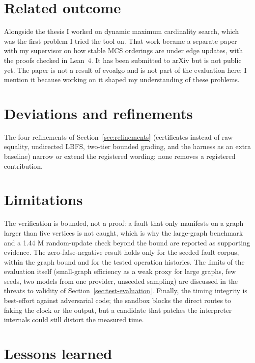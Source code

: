 \section{Related outcome}

Alongside the thesis I worked on dynamic maximum cardinality search, which was
the first problem I tried the tool on. That work became a separate paper with my
supervisor on how stable MCS orderings are under edge updates, with the proofs
checked in Lean~4. It has been submitted to arXiv but is not public yet. The
paper is not a result of evoalgo and is not part of the evaluation here; I
mention it because working on it shaped my understanding of these problems.

\section{Deviations and refinements}

The four refinements of Section~\ref{sec:refinements} (certificates instead of
raw equality, undirected LBFS, two-tier bounded grading, and the harness as an
extra baseline) narrow or extend the registered wording; none removes a
registered contribution.

\section{Limitations}

The verification is bounded, not a proof: a fault that only manifests on a
graph larger than five vertices is not caught, which is why the large-graph
benchmark and a 1.44 M random-update check beyond the bound are reported as
supporting evidence. The zero-false-negative result holds only for the seeded
fault corpus, within the graph bound and for the tested operation histories.
The limits of the evaluation itself (small-graph efficiency as a weak proxy for
large graphs, few seeds, two models from one provider, unseeded sampling) are
discussed in the threats to validity of Section~\ref{sec:test-evaluation}.
Finally, the timing integrity is best-effort against adversarial
code; the sandbox blocks the direct routes to faking the clock or the output,
but a candidate that patches the interpreter internals could still distort the
measured time.

\section{Lessons learned}

